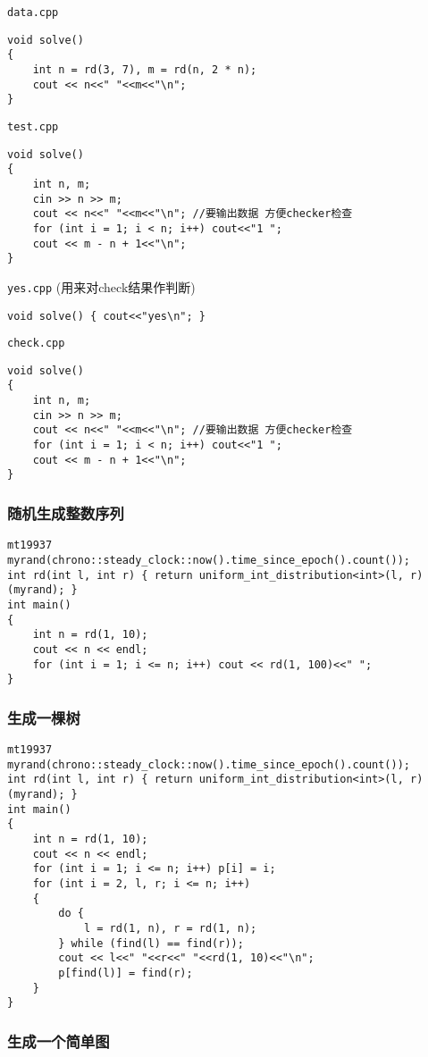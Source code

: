 \documentclass[a4paper, fontset=none]{ctexart}
\begin{document}
\texttt{data.cpp}
\begin{verbatim}
void solve()
{
    int n = rd(3, 7), m = rd(n, 2 * n);
    cout << n<<" "<<m<<"\n";
}
\end{verbatim}

\texttt{test.cpp}
\begin{verbatim}
void solve()
{
    int n, m;
    cin >> n >> m;
    cout << n<<" "<<m<<"\n"; //要输出数据 方便checker检查
    for (int i = 1; i < n; i++) cout<<"1 ";
    cout << m - n + 1<<"\n";
}
\end{verbatim}

\texttt{yes.cpp} (用来对check结果作判断)
\begin{verbatim}
void solve() { cout<<"yes\n"; }
\end{verbatim}

\texttt{check.cpp}
\begin{verbatim}
void solve()
{
    int n, m;
    cin >> n >> m;
    cout << n<<" "<<m<<"\n"; //要输出数据 方便checker检查
    for (int i = 1; i < n; i++) cout<<"1 ";
    cout << m - n + 1<<"\n";
}
\end{verbatim}
\subsubsection{随机生成整数序列}

\begin{verbatim}
mt19937 myrand(chrono::steady_clock::now().time_since_epoch().count());
int rd(int l, int r) { return uniform_int_distribution<int>(l, r)(myrand); }
int main()
{
    int n = rd(1, 10);
    cout << n << endl;
    for (int i = 1; i <= n; i++) cout << rd(1, 100)<<" ";
}
\end{verbatim}
\subsubsection{生成一棵树}

\begin{verbatim}
mt19937 myrand(chrono::steady_clock::now().time_since_epoch().count());
int rd(int l, int r) { return uniform_int_distribution<int>(l, r)(myrand); }
int main()
{
    int n = rd(1, 10);
    cout << n << endl;
    for (int i = 1; i <= n; i++) p[i] = i;
    for (int i = 2, l, r; i <= n; i++)
    {
        do {
            l = rd(1, n), r = rd(1, n);
        } while (find(l) == find(r));
        cout << l<<" "<<r<<" "<<rd(1, 10)<<"\n";
        p[find(l)] = find(r);
    }
}
\end{verbatim}
\subsubsection{生成一个简单图}
\end{document}
